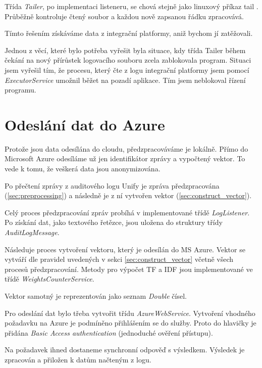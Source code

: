 \documentclass[thesis=M,czech]{FITthesis}[2012/10/20]
\begin{document}
		Třída \textit{Tailer}, po implementaci listeneru, se chová stejně jako linuxový příkaz tail \cite{tailLinux}. Průběžně kontroluje čtený soubor a každou nově zapsanou řádku zpracovává.
		
		Tímto řešením získáváme data z integrační platformy, aniž bychom jí zatěžovali. 
		
		 Jednou z věcí, které bylo potřeba vyřešit byla situace, kdy třída Tailer během čekání na nový přírůstek logovacího souboru zcela zablokovala program. Situaci jsem vyřešil tím, že procesu, který čte z logu integrační platformy jsem pomocí \textit{ExecutorService} \cite{javaExecutorService} umožnil běžet na pozadí aplikace. Tím jsem neblokoval řízení programu.
	\section{Odeslání dat do Azure}
		\label{sec:send_to_azure}
		
		Protože jsou data odesílána do cloudu, předzpracováváme je lokálně. Přímo do Microsoft Azure odesíláme už jen identifikátor zprávy a vypočtený vektor. To vede k tomu, že veškerá data jsou anonymizována.
		
		Po přečtení zprávy z auditového logu Unify je zpráva předzpracována (\ref{sec:preprocessing}) a následně je z ní vytvořen vektor (\ref{sec:construct_vector}).
		 
		Celý proces předzpracování zpráv probíhá v implementované třídě \textit{LogListener}. Po získání dat, jako textového řetězce, jsou uložena do struktury třídy \textit{AuditLogMessage}. 
		
		Následuje proces vytvoření vektoru, který je odesílán do MS Azure. Vektor se vytváří dle pravidel uvedených v sekci \ref{sec:construct_vector} včetně všech procesů předzpracování. Metody pro výpočet TF a IDF jsou implementované ve třídě \textit{WeightsCounterService}.  
		
		Vektor samotný je reprezentován jako seznam \textit{Double} čísel.
		
		Pro odeslání dat bylo třeba vytvořit třídu \textit{AzureWebService}. Vytvoření vhodného požadavku na Azure je podmíněno přihlášením se do služby. Proto do hlavičky je přidána \textit{Basic Access authentication} (jednoduché ověření přístupu).
		
		Na požadavek ihned dostaneme synchronní odpověď s výsledkem. Výsledek je zpracován a přiložen k datům načteným z logu.
		
\end{document}
